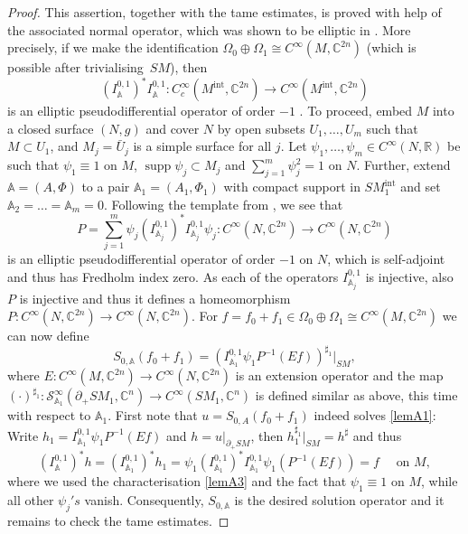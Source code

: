 \documentclass[JEP,XML,SOM,Unicode,published]{cedram}
\theoremstyle{plain}
\theoremstyle{definition}
\newcommand{\A}{\mathbb{A}}
\newcommand{\R}{\mathbb{R}}
\newcommand{\C}{\mathbb{C}}
\newcommand{\interior}{\mathrm{int}}
\DeclareMathOperator{\supp}{supp}
\newcommand{\1}{{\bf 1}}
\begin{document}
\begin{proof}
This assertion, together with the tame estimates, is proved with help of the associated normal operator, which was shown to be elliptic in \cite{AiAs15}. More precisely, if we make the identification $\Omega_0\oplus \Omega_1 \cong C^\infty(M,\C^{2n})$ (which is possible after trivialising~$SM$), then
\begin{equation*}
(I_\A^{0,1})^*I_\A^{0,1}:C_c^\infty(M^\interior,\C^{2n})\to C^\infty(M^\interior,\C^{2n})
\end{equation*}
is an elliptic pseudodifferential operator of order $-1$ \cite[\S 4.2]{AiAs15}. To proceed, embed $M$ into a closed surface $(N,g)$ and cover $N$ by open subsets $U_1,\dots,U_m$ such that $M\subset U_1$, and $M_j = \bar U_j$ is a simple surface for all $j$. Let $\psi_1,\dots, \psi_m\in C^\infty(N,\R)$ be such that $\psi_1\equiv 1$ on $M$, $\supp \psi_j\subset M_j$ and $\sum_{j=1}^m\psi_j^2=1$ on $N$.
Further, extend $\A=(A,\Phi)$ to a pair $\A_1=(A_1,\Phi_1)$ with compact support in $SM^{\interior}_1$ and set $\A_2=\dots=\A_m = 0$. Following the template from \cite[\S 8.2]{PSU20}, we see that
\begin{equation*}
P= \sum_{j=1}^m \psi_j (I_{\A_j}^{0,1})^*I_{\A_j}^{0,1} \psi_j: C^\infty(N,\C^{2n})\to C^\infty(N,\C^{2n})
\end{equation*}
is an elliptic pseudodifferential operator of order $-1$ on $N$, which is self-adjoint and thus has Fredholm index zero. As each of the operators $I_{\A_j}^{0,1}$ is injective, also $P$ is injective and thus it defines a homeomorphism $P:C^\infty(N,\C^{2n})\to C^\infty(N,\C^{2n})$. For $f=f_0+f_1\in \Omega_0\oplus\Omega_1\cong C^\infty(M,\C^{2n})$ we can now define
\begin{equation} \label{lemA4}
S_{0,\A}(f_0+f_1) = (I_{\A_1}^{0,1}\psi_1 P^{-1}(Ef))^{\sharp_1}\vert_{SM},
\end{equation}
where $E:C^\infty(M,\C^{2n})\to C^\infty(N,\C^{2n})$ is an extension operator and the map $(\cdot)^{\sharp_1}:\mathcal{S}_{\A_1}^\infty(\partial_+SM_1,\C^n)\to C^\infty(SM_1,\C^{n})$ is defined similar as above, this time with respect to $\A_1$. First note that $u=S_{0,A}(f_0+f_1)$ indeed solves \eqref{lemA1}: Write $h_1 = I_{\A_1}^{0,1}\psi_1 P^{-1}(Ef)$ and $h = u \vert_{\partial_+SM}$, then $h_1^{\sharp_1}\vert_{SM}=h^\sharp$ and thus
\begin{equation*}
(I_\A^{0,1})^*h= (I_{\A_1}^{0,1})^*h_1 = \psi_1 (I_{\A_1}^{0,1})^* I_{\A_1}^{0,1} \psi_1 \left( P^{-1}(Ef)\right)= f \quad \text{ on } M,
\end{equation*}
where we used the characterisation \eqref{lemA3} and the fact that $\psi_1\equiv 1$ on $M$, while all other $\psi_j's$ vanish. Consequently, $S_{0,\A}$ is the desired solution operator and it remains to check the tame estimates.


\end{proof}
\end{document}
